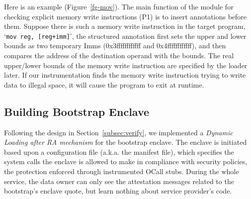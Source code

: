 Here is an example (Figure~\ref{fg-mov}). The main function of the module for checking explicit memory write instructions (P1) is to insert annotations before them. Suppose there is such a memory write instruction in the target program, `\texttt{mov reg, [reg+imm]}',
the structured annotation first sets the upper and lower bounds as two temporary Imms (0x3ffffffffffff and 0x4ffffffffffff), and then compares the address of the destination operand with the bounds. The real upper/lower bounds of the memory write instruction are specified by the loader later. If our instrumentation finds the memory write instruction trying to write data to illegal space, it will cause the program to exit at runtime. 







\subsection{Building Bootstrap Enclave}\label{subsec:bootstrap-impl}
%
Following the design in Section~\ref{subsec:verify}, we implemented a \textit{Dynamic Loading after RA mechanism} for the bootstrap enclave. The enclave is initiated based upon a configuration file (a.k.a. the manifest file), which specifies the system calls the enclave is allowed to make in compliance with security policies, the protection enforced through instrumented OCall stubs. During the whole service, the data owner can only see the attestation messages related to the bootstrap's enclave quote, but learn nothing about service provider’s code.

